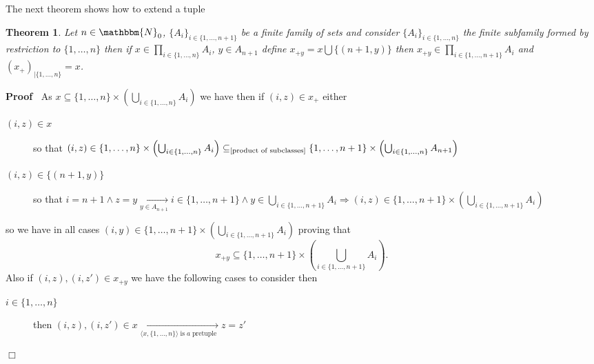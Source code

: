 \documentclass{book}
\newcommand{\Rightarrowlim}{\mathop{\rightarrow}\limits}
\newcommand{\tmop}[1]{\ensuremath{\operatorname{#1}}}
\newenvironment{proof}{\noindent\textbf{Proof\ }}{\hspace*{\fill}$\Box$\medskip}
\newtheorem{theorem}{Theorem}
\begin{document}
{{The next theorem shows how to extend a tuple

\begin{theorem}
  \label{super tuple}Let $n \in \mathbbm{N}_0$, $\{ A_i \}_{i \in \{ 1,
  \ldots, n + 1 \}}$ be a finite family of sets and consider $\{ A_i \}_{i \in
  \{ 1, \ldots, n \}}$ the finite subfamily formed by restriction to $\{ 1,
  \ldots, n \}$ then if $x \in \prod_{i \in \{ 1, \ldots, n \}} A_i$, $y \in
  A_{n + 1}$ define $x_{+ y} = x \bigcup \{ (n + 1, y) \}$ then $x_{+ y} \in
  \prod_{i \in \{ 1, \ldots, n + 1 \}} A_i$ and $(x_+)_{| \{ 1, \ldots, n \}}
  = x$.
\end{theorem}

\begin{proof}
  As $x \subseteq \{ 1, \ldots, n \} \times \left( \bigcup_{i \in \{ 1,
  \ldots, n \}} A_i \right)$ we have then if $(i, z) \in x_+$ either
  \begin{description}
    \item[$(i, z) \in x$] so that $(i, z) \in \{ 1, \ldots, n \} \times \left(
    \bigcup_{i \in \{ 1, \ldots, n \}} A_i \right)
    \subseteq_{\text{\ref{product of subclasses}}} \{ 1, \ldots, n + 1 \}
    \times \left( \bigcup_{i \in \{ 1, \ldots, n \}} A_{n + 1} \right)$
    
    \item[$(i, z) \in \{ (n + 1, y) \}$] so that $i = n + 1 \wedge z = y
    \Rightarrowlim_{y \in A_{n + 1}} i \in \{ 1, \ldots, n + 1 \} \wedge y \in
    \bigcup_{i \in \{ 1, \ldots, n + 1 \}} A_i \Rightarrow (i, z) \in \{ 1,
    \ldots, n + 1 \} \times \left( \bigcup_{i \in \{ 1, \ldots, n + 1 \}} A_i
    \right)$
  \end{description}
  so we have in all cases $(i, y) \in \{ 1, \ldots, n + 1 \} \times \left(
  \bigcup_{i \in \{ 1, \ldots, n + 1 \}} A_i \right)$ proving that
  \begin{equation}
    \label{eq 5.1.4} x_{+ y} \subseteq \{ 1, \ldots, n + 1 \} \times \left(
    \bigcup_{i \in \{ 1, \ldots, n + 1 \}} A_i \right) .
  \end{equation}
  Also if $(i, z), (i, z') \in x_{+ y}$ we have the following cases to
  consider then
  \begin{description}
    \item[$i \in \{ 1, \ldots, n \}$] then $(i, z), (i, z') \in x
    \Rightarrowlim_{\langle x, \{ 1, \ldots, n \} \rangle \tmop{is} a
    \tmop{pretuple}} z = z'$
    

\end{description}
\end{proof}}}
\end{document}
